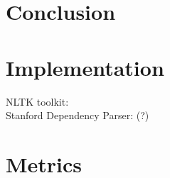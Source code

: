 \documentclass{report}
\theoremstyle{definition}
\theoremstyle{plain}
\begin{document}
%
%

\chapter{Conclusion}

%
%



%
%

\appendix
\chapter{Implementation}
\label{appendix:impl}

NLTK toolkit: \cite{bird2009natural}\\
Stanford Dependency Parser: \cite{de2008stanford}(?)

%
%



%
%

\chapter{Metrics}
\label{appendix:metric}
\end{document}
